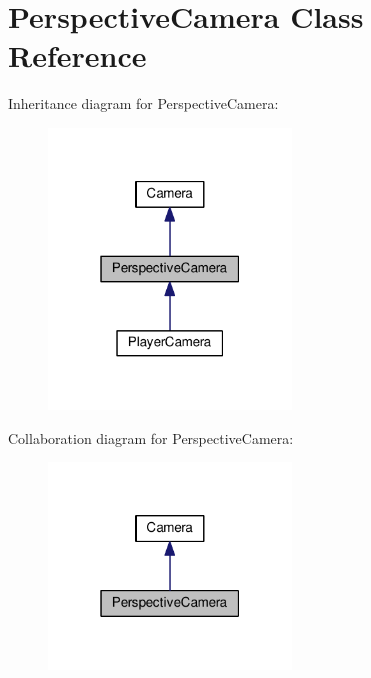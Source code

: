 \hypertarget{class_perspective_camera}{}\section{Perspective\+Camera Class Reference}
\label{class_perspective_camera}


Inheritance diagram for Perspective\+Camera\+:\nopagebreak
\begin{figure}[H]
\begin{center}
\leavevmode
\includegraphics[width=183pt]{class_perspective_camera__inherit__graph}
\end{center}
\end{figure}


Collaboration diagram for Perspective\+Camera\+:\nopagebreak
\begin{figure}[H]
\begin{center}
\leavevmode
\includegraphics[width=183pt]{class_perspective_camera__coll__graph}
\end{center}
\end{figure}
